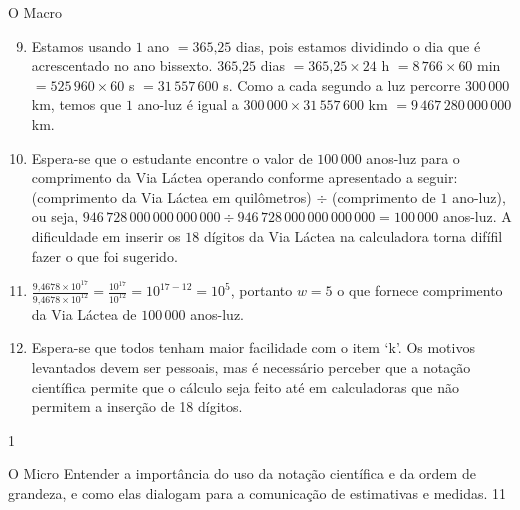 \clearmargin
\begin{answer}{O Macro}
{
\begin{enumerate}\setcounter{enumi}{8}
\item Estamos usando \(1\) ano \(=365\text{,}25\) dias, pois estamos dividindo o dia que é acrescentado no ano bissexto. \(365\text{,}25\) dias \(= 365\text{,}25 \times 24\) h \(= 8\, 766 \times 60\) min \(= 525\,960 \times 60\) s \(= 31\, 557\, 600\) s. Como a cada segundo a luz percorre \(300\, 000\) km, temos que \(1\) ano-luz é igual a \(300\,000 \times 31\, 557\, 600\) km \(= 9\, 467\, 280\, 000\, 000\) km.

\item {} 
Espera-se que o estudante encontre o valor de \(100\, 000\) anos-luz para o comprimento da Via Láctea operando conforme apresentado a seguir: (comprimento da Via Láctea em quilômetros) \(\div\) (comprimento de \(1\) ano-luz), ou seja, \(946\, 728\, 000\, 000\, 000\, 000 \div 946\, 728\, 000\, 000\, 000\, 000 = 100\, 000\) anos-luz. A dificuldade em inserir os \(18\) dígitos da Via Láctea na calculadora torna difífil fazer o que foi sugerido.

\item {} 
\(\frac{9\text{,}4678 \times 10^{17}}{9\text{,}4678 \times 10^{12}}=\frac{10^{17}}{10^{12}} = 10^{17-12} = 10^5\), portanto \(w=5\) o que fornece comprimento da Via Láctea de  \(100\, 000\) anos-luz.

\item {} 
Espera-se que todos tenham maior facilidade com o item ‘k’. Os motivos levantados devem ser pessoais, mas é necessário perceber que a notação científica permite que o cálculo seja feito até em calculadoras que não permitem a inserção de 18 dígitos.
\end{enumerate}
}{1}
\end{answer}
\clearmargin
\begin{objectives}{O Micro}
{
Entender a importância do uso da notação científica e da ordem de grandeza, e como elas dialogam para a comunicação de estimativas e medidas.
}{1}{1}
\end{objectives}
